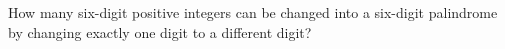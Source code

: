 How many six-digit positive integers can be changed into a six-digit palindrome by changing exactly one digit to a different digit?
